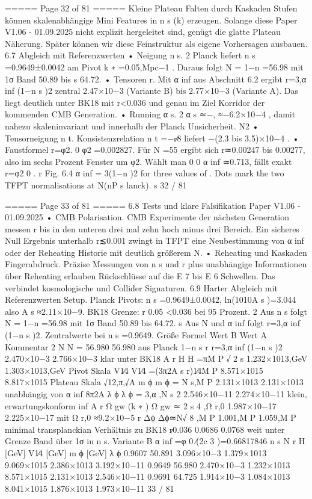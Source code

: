 \begin{MyVerbatim}
===== Page 32 of 81 =====
Kleine Plateau Falten durch Kaskaden Stufen können skalenabhängige Mini Features in n s (k) erzeugen. Solange diese
Paper V1.06 - 01.09.2025
nicht explizit hergeleitet sind, genügt die glatte Plateau Näherung. Später können wir diese Feinstruktur als eigene
Vorhersagen ausbauen.
6.7 Abgleich mit Referenzwerten
• Neigung n s.
2
Planck liefert n s =0.9649±0.0042 am Pivot k ∗ =0.05,Mpc−1 . Daraus folgt N = 1−n =56.98 mit 1σ Band 50.89 bis
s
64.72.
• Tensoren r.
Mit α inf aus Abschnitt 6.2 ergibt r=3,α inf (1−n s )2 zentral
2.47×10−3 (Variante B) bis 2.77×10−3 (Variante A). Das liegt deutlich unter BK18 mit r<0.036 und genau im Ziel
Korridor der kommenden CMB Generation.
• Running α s.
2
α s ≃−, ≈−6.2×10−4 , damit nahezu skaleninvariant und innerhalb der Planck Unsicherheit.
N2
• Tensorneigung n t.
Konsistenzrelation n t =−r∕8 liefert −(2.3 bis 3.5)×10−4 .
• Faustformel r=φ2.
0
φ2 =0.002827. Für N =55 ergibt sich r≃0.00247 bis 0.00277, also im sechs Prozent Fenster um φ2. Wählt man
0 0
α inf ≃0.713, fällt exakt r=φ2 0 .
r
Fig. 6.4 α inf = 3(1−n )2 for three values of . Dots mark the two TFPT normalisations at N(nP s lanck).
s 32 / 81

===== Page 33 of 81 =====
6.8 Tests und klare Falsifikation
Paper V1.06 - 01.09.2025
• CMB Polarisation.
CMB Experimente der nächsten Generation messen r bis in den unteren drei mal zehn hoch minus drei Bereich. Ein
sicheres Null Ergebnis unterhalb r≲0.001 zwingt in TFPT eine Neubestimmung von α inf oder der Reheating Historie mit
deutlich größerem N.
• Reheating und Kaskaden Fingerabdruck.
Präzise Messungen von n s und r plus unabhängige Informationen über Reheating erlauben Rückschlüsse auf die E 7 bis
E 6 Schwellen. Das verbindet kosmologische und Collider Signaturen.
6.9 Harter Abgleich mit Referenzwerten
Setup.
Planck Pivots: n s =0.9649±0.0042, ln(1010A s )=3.044 also A s ≈2.11×10−9.
BK18 Grenze: r 0.05 <0.036 bei 95 Prozent.
2
Aus n s folgt N = 1−n =56.98 mit 1σ Band 50.89 bis 64.72.
s
Aus N und α inf folgt r=3,α inf (1−n s )2.
Zentralwerte bei n s =0.9649.
Größe Formel Wert B Wert A Kommentar
2
N N = 56.980 56.980 aus Planck
1−n
s
r r=3,α inf (1−n s )2 2.470×10−3 2.766×10−3 klar unter BK18
A r
H H =πM P √ 2 s 1.232×1013,GeV 1.303×1013,GeV Pivot Skala
V1∕4 V1∕4 =(3π2A s r)1∕4M P 8.571×1015 8.817×1015 Plateau Skala
√12,π,√A
m ϕ m ϕ = N s,M P 2.131×1013 2.131×1013 unabhängig von α inf
8π2A
λ ϕ λ ϕ = 3,α ,N s 2 2.546×10−11 2.274×10−11 klein, erwartungskonform
inf
A r
Ω gw (k ∗ ) Ω gw ≃ 2 s 4 ,Ω r,0 1.987×10−17 2.225×10−17 mit Ω r,0 ≈9.2×10−5
r
Δϕ Δϕ≃N√ 8 ,M P 1.001,M P 1.059,M P minimal transplanckian
Verhältnis zu BK18 r∕0.036 0.0686 0.0768 weit unter Grenze
Band über 1σ in n s.
Variante B α inf =φ 0 ∕(2c 3 )=0.66817846
n s N r H [GeV] V1∕4 [GeV] m ϕ [GeV] λ ϕ
0.9607 50.891 3.096×10−3 1.379×1013 9.069×1015 2.386×1013 3.192×10−11
0.9649 56.980 2.470×10−3 1.232×1013 8.571×1015 2.131×1013 2.546×10−11
0.9691 64.725 1.914×10−3 1.084×1013 8.041×1015 1.876×1013 1.973×10−11
33 / 81


\end{MyVerbatim}
